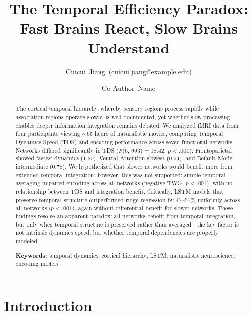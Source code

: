 \documentclass[10pt,letterpaper]{article}
\title{The Temporal Efficiency Paradox: Fast Brains React, Slow Brains Understand}
\author[1]{\mbox{Cuicui Jiang (cuicui.jiang@example.edu)}}
\author[1]{\mbox{Co-Author Name}}
\affil[1]{Department of Psychology, University Name}
\begin{document}
\maketitle

\begin{abstract}
The cortical temporal hierarchy, whereby sensory regions process rapidly while association regions operate slowly, is well-documented, yet whether slow processing enables deeper information integration remains debated. We analyzed fMRI data from four participants viewing $\sim$65 hours of naturalistic movies, computing Temporal Dynamics Speed (TDS) and encoding performance across seven functional networks. Networks differed significantly in TDS ($F$(6, 993) = 18.42, $p < .001$): Frontoparietal showed fastest dynamics (1.20), Ventral Attention slowest (0.64), and Default Mode intermediate (0.78). We hypothesized that slower networks would benefit more from extended temporal integration; however, this was not supported: simple temporal averaging impaired encoding across all networks (negative TWG, $p < .001$), with no relationship between TDS and integration benefit. Critically, LSTM models that preserve temporal structure outperformed ridge regression by 47--57\% uniformly across all networks ($p < .001$), again without differential benefit for slower networks. These findings resolve an apparent paradox: all networks benefit from temporal integration, but only when temporal structure is preserved rather than averaged---the key factor is not intrinsic dynamics speed, but whether temporal dependencies are properly modeled.

\textbf{Keywords:}
temporal dynamics; cortical hierarchy; LSTM; naturalistic neuroscience; encoding models
\end{abstract}


\section{Introduction}
\end{document}
